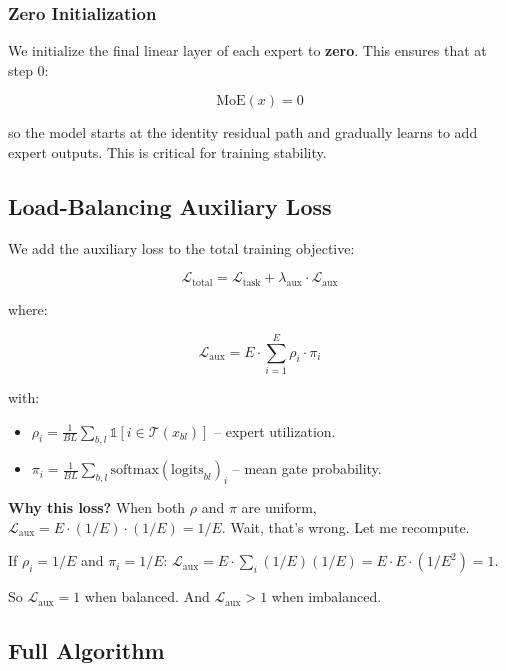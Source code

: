 \subsubsection{Zero Initialization}

We initialize the final linear layer of each expert to \textbf{zero}. This ensures 
that at step 0:

\[
\text{MoE}(x) = 0
\tag{4.11}
\]

so the model starts at the identity residual path and gradually learns to 
add expert outputs. This is critical for training stability.

\subsection{Load-Balancing Auxiliary Loss}

We add the auxiliary loss to the total training objective:

\[
\mathcal{L}_\text{total} = \mathcal{L}_\text{task} + \lambda_\text{aux} \cdot \mathcal{L}_\text{aux}
\tag{4.12}
\]

where:

\[
\mathcal{L}_\text{aux} = E \cdot \sum_{i=1}^{E} \rho_i \cdot \pi_i
\tag{4.13}
\]

with:
\begin{itemize}
\item $\rho_i = \frac{1}{BL} \sum_{b,l} \mathbb{1}[i \in \mathcal{T}(x_{bl})]$ -- expert utilization.
\item $\pi_i = \frac{1}{BL} \sum_{b,l} \text{softmax}(\text{logits}_{bl})_i$ -- mean gate probability.

\end{itemize}
\textbf{Why this loss?} When both $\rho$ and $\pi$ are uniform, 
$\mathcal{L}_\text{aux} = E \cdot (1/E) \cdot (1/E) = 1/E$. Wait, that's 
wrong. Let me recompute.

If $\rho_i = 1/E$ and $\pi_i = 1/E$:
$\mathcal{L}_\text{aux} = E \cdot \sum_i (1/E)(1/E) = E \cdot E \cdot (1/E^2) = 1$.

So $\mathcal{L}_\text{aux} = 1$ when balanced. And $\mathcal{L}_\text{aux} > 1$ 
when imbalanced.

\subsection{Full Algorithm}

